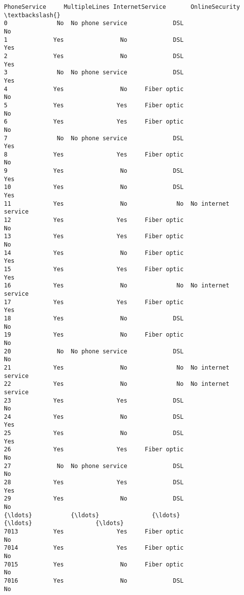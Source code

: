 \documentclass[11pt]{article}
\begin{document}
\begin{tcolorbox}[breakable, boxrule=.5pt, size=fbox, pad at break*=1mm, opacityfill=0]
\begin{Verbatim}[commandchars=\\\{\}]
     PhoneService     MultipleLines InternetService       OnlineSecurity  \textbackslash{}
0              No  No phone service             DSL                   No
1             Yes                No             DSL                  Yes
2             Yes                No             DSL                  Yes
3              No  No phone service             DSL                  Yes
4             Yes                No     Fiber optic                   No
5             Yes               Yes     Fiber optic                   No
6             Yes               Yes     Fiber optic                   No
7              No  No phone service             DSL                  Yes
8             Yes               Yes     Fiber optic                   No
9             Yes                No             DSL                  Yes
10            Yes                No             DSL                  Yes
11            Yes                No              No  No internet service
12            Yes               Yes     Fiber optic                   No
13            Yes               Yes     Fiber optic                   No
14            Yes                No     Fiber optic                  Yes
15            Yes               Yes     Fiber optic                  Yes
16            Yes                No              No  No internet service
17            Yes               Yes     Fiber optic                  Yes
18            Yes                No             DSL                   No
19            Yes                No     Fiber optic                   No
20             No  No phone service             DSL                   No
21            Yes                No              No  No internet service
22            Yes                No              No  No internet service
23            Yes               Yes             DSL                   No
24            Yes                No             DSL                  Yes
25            Yes                No             DSL                  Yes
26            Yes               Yes     Fiber optic                   No
27             No  No phone service             DSL                   No
28            Yes               Yes             DSL                  Yes
29            Yes                No             DSL                   No
{\ldots}           {\ldots}               {\ldots}             {\ldots}                  {\ldots}
7013          Yes               Yes     Fiber optic                   No
7014          Yes               Yes     Fiber optic                   No
7015          Yes                No     Fiber optic                   No
7016          Yes                No             DSL                   No

\end{Verbatim}
\end{tcolorbox}
\end{document}

